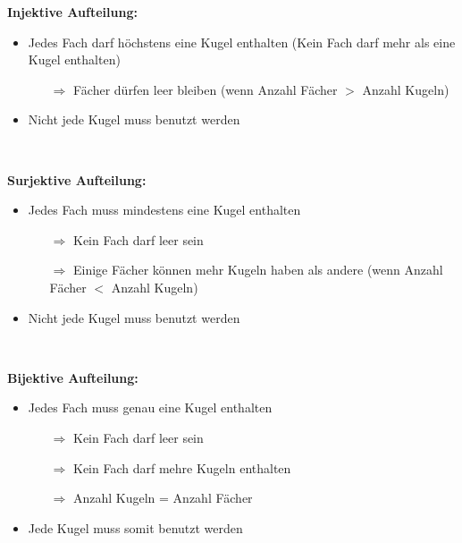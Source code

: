\textbf{Injektive Aufteilung:}


\begin{itemize}[leftmargin=*]
\item Jedes Fach darf höchstens eine Kugel enthalten (Kein Fach darf mehr als eine Kugel enthalten)
\begin{itemize}
\item[$\Rightarrow$] Fächer dürfen leer bleiben (wenn Anzahl Fächer $>$ Anzahl Kugeln)
\end{itemize}
\item Nicht jede Kugel muss benutzt werden
\end{itemize}\

\textbf{Surjektive Aufteilung:}

\begin{itemize}[leftmargin=*]
\item Jedes Fach muss mindestens eine Kugel enthalten
\begin{itemize}
\item[$\Rightarrow$] Kein Fach darf leer sein
\item[$\Rightarrow$] Einige Fächer können mehr Kugeln haben als andere (wenn Anzahl Fächer $<$ Anzahl Kugeln)
\end{itemize}
\item Nicht jede Kugel muss benutzt werden
\end{itemize}\

\textbf{Bijektive Aufteilung:}

\begin{itemize}[leftmargin=*]
\item Jedes Fach muss genau eine Kugel enthalten
\begin{itemize}
\item[$\Rightarrow$] Kein Fach darf leer sein
\item[$\Rightarrow$] Kein Fach darf mehre Kugeln enthalten
\item[$\Rightarrow$] Anzahl Kugeln = Anzahl Fächer
\end{itemize}
\item Jede Kugel muss somit benutzt werden
\end{itemize}\

